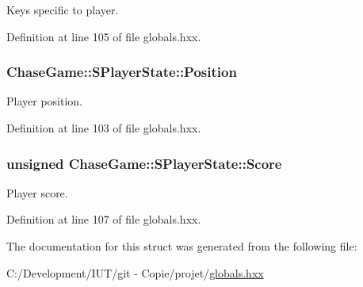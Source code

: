 Keys specific to player. 



Definition at line 105 of file globals.\-hxx.

\hypertarget{struct_chase_game_1_1_s_player_state_a0a68b95a4255f2a543675f88b00847b4}{
\subsubsection[{Position}]{ Chase\-Game\-::\-S\-Player\-State\-::\-Position}}\label{struct_chase_game_1_1_s_player_state_a0a68b95a4255f2a543675f88b00847b4}


Player position. 



Definition at line 103 of file globals.\-hxx.

\hypertarget{struct_chase_game_1_1_s_player_state_a268594c795a70cf1eb9fe6061bfa57d0}{
\subsubsection[{Score}]{\setlength{\rightskip}{0pt plus 5cm}unsigned Chase\-Game\-::\-S\-Player\-State\-::\-Score}}\label{struct_chase_game_1_1_s_player_state_a268594c795a70cf1eb9fe6061bfa57d0}


Player score. 



Definition at line 107 of file globals.\-hxx.



The documentation for this struct was generated from the following file\-:\begin{DoxyCompactItemize}
\item 
C\-:/\-Development/\-I\-U\-T/git -\/ Copie/projet/\hyperlink{globals_8hxx}{globals.\-hxx}\end{DoxyCompactItemize}
